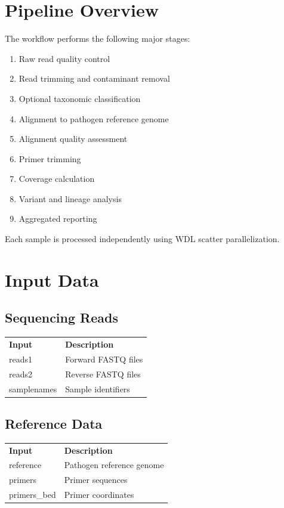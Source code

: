 \documentclass[11pt]{article}
\begin{document}
\section{Pipeline Overview}

The workflow performs the following major stages:

\begin{enumerate}
\item Raw read quality control
\item Read trimming and contaminant removal
\item Optional taxonomic classification
\item Alignment to pathogen reference genome
\item Alignment quality assessment
\item Primer trimming
\item Coverage calculation
\item Variant and lineage analysis
\item Aggregated reporting
\end{enumerate}

Each sample is processed independently using WDL scatter parallelization.

\section{Input Data}

\subsection{Sequencing Reads}

\begin{longtable}{p{4cm} p{10cm}}
\textbf{Input} & \textbf{Description} \\
reads1 & Forward FASTQ files \\
reads2 & Reverse FASTQ files \\
samplenames & Sample identifiers \\
\end{longtable}

\subsection{Reference Data}

\begin{longtable}{p{4cm} p{10cm}}
\textbf{Input} & \textbf{Description} \\
reference & Pathogen reference genome \\
primers & Primer sequences \\
primers\_bed & Primer coordinates \\
\end{longtable}
\end{document}
